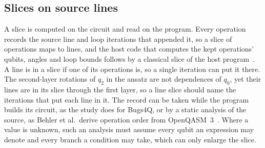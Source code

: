 \subsection{Slices on source lines}\label{sec:lines}
A slice is computed on the circuit and read on the program. Every operation records the source line and loop
iterations that appended it, so a slice of operations maps to lines, and the host code that computes the kept
operations' qubits, angles and loop bounds follows by a classical slice of the host program~\cite{weiser1984program}.
A line is in a slice if one of its operations is, so a single iteration can put it there. The second-layer rotations
of $q_2$ in the ansatz are not dependences of $q_0$, yet their lines are in its slice through the first layer, so a
line slice should name the iterations that put each line in it. The record can be taken while the program builds its circuit, as the study does for
Bugs4Q, or by a static analysis of the source, as Behler et al.\ derive operation order from OpenQASM~3~\cite{behler2025static}.
Where a value is unknown, such an analysis must assume every qubit an expression may denote and every branch a
condition may take, which can only enlarge the slice.
